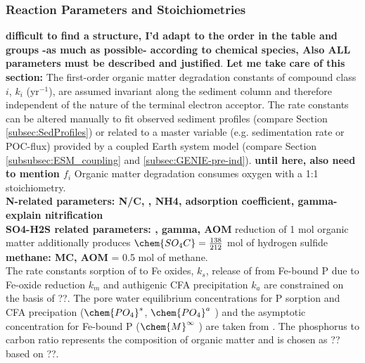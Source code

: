 \documentclass[gmd, manuscript]{copernicus}
\begin{document}
\subsubsection {Reaction Parameters and Stoichiometries}
\textbf{difficult to find a structure, I'd adapt to the order in the table and groups -as much as possible- according to chemical species, Also ALL parameters must be described and justified}.
\textbf{Let me take care of this section:} The first-order organic matter degradation constants of compound class $i$, $k_i$ (yr$^{-1}$), are assumed invariant along the sediment column and therefore independent of the nature of the terminal electron acceptor. The rate constants can be 
altered manually to fit observed sediment profiles (compare Section \ref{subsec:SedProfiles}) or related to a master variable 
(e.g. sedimentation rate or POC-flux) provided by a coupled Earth system model (compare Section \ref{subsubsec:ESM_coupling} and \ref{subsec:GENIE-pre-ind}). 
\textbf{until here, also need to mention $f_i$}
Organic matter degradation consumes oxygen with a 1:1 stoichiometry.\\
\textbf{N-related parameters: N/C, , NH4, adsorption coefficient, gamma- explain nitrification}\\
\textbf{SO4-H2S related parameters:  ,  gamma, AOM} reduction of 1 mol organic matter additionally produces $\chem{SO_4C}=\frac{138}{212}$ mol of hydrogen sulfide \\
\textbf{methane: MC, AOM}  = 0.5 mol of methane. \\
The rate constants sorption of  to Fe oxides, $k_s$, release of  from Fe-bound P due to Fe-oxide reduction $k_m$  and authigenic CFA precipitation $k_a$ are constrained on the basis of ??. The pore water equilibrium concentrations for P sorption and CFA precipation ($\chem{PO_4}^s$, $\chem{PO_4}^a$ ) and the asymptotic concentration for Fe-bound P ($\chem{M}^\infty$ ) are taken from  \citet{palastanga_long_term_2011}. The phosphorus to carbon ratio represents the composition of organic matter and is chosen as ?? based on ??.\\
\end{document}
